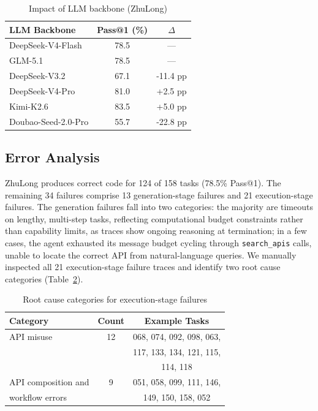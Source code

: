 \begin{table}[htbp]
\centering
\caption{Impact of LLM backbone (ZhuLong)}
\label{tab:llm-comparison}
\begin{tabular}{lcc}
\toprule
\textbf{LLM Backbone} & \textbf{Pass@1 (\%)} & \textbf{$\Delta$} \\
\midrule
DeepSeek-V4-Flash & 78.5 & — \\
GLM-5.1 & 78.5 & — \\
DeepSeek-V3.2 & 67.1 & -11.4 pp \\
DeepSeek-V4-Pro & 81.0 & +2.5 pp \\
Kimi-K2.6 & 83.5 & +5.0 pp \\
Doubao-Seed-2.0-Pro & 55.7 & -22.8 pp \\
\bottomrule
\end{tabular}
\end{table}

\subsection{Error Analysis}
\label{sec:error-analysis}

ZhuLong produces correct code for 124 of 158 tasks (78.5\% Pass@1). The 
remaining 34 failures comprise 13 generation-stage failures and 21 
execution-stage failures. The generation failures fall into two categories: 
the majority are timeouts on lengthy, multi-step tasks, reflecting 
computational budget constraints rather than capability limits, as traces 
show ongoing reasoning at termination; in a few cases, the agent exhausted 
its message budget cycling through \texttt{search\_apis} calls, unable to 
locate the correct API from natural-language queries. 
We manually inspected 
all 21 execution-stage failure traces and identify two root cause categories 
(Table~\ref{tab:error-categories}).

\begin{table}[t]
\centering
\caption{Root cause categories for execution-stage failures}
\label{tab:error-categories}
\begin{tabular}{lcc}
\toprule
Category & Count & Example Tasks \\
\midrule
API misuse & 12 & 068, 074, 092, 098, 063, \\ 
& & 117, 133, 134, 121, 115, \\
& & 114, 118 \\
\midrule
API composition and  & 9 & 051, 058, 099, 111, 146, \\
workflow errors & & 149, 150, 158, 052 \\
\bottomrule
\end{tabular}
\end{table}

